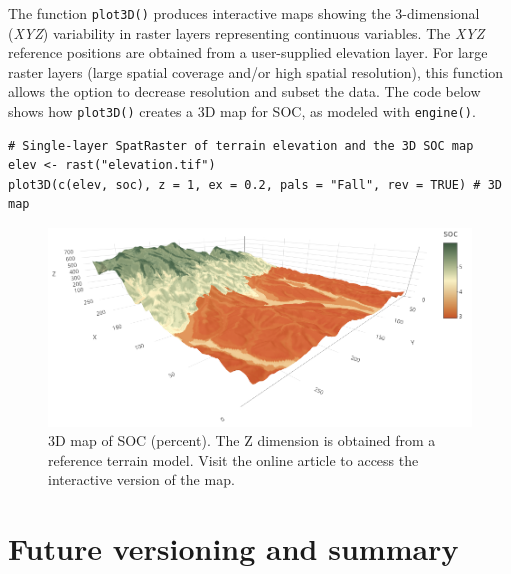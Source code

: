 The function \texttt{plot3D()} produces interactive maps showing the 3-dimensional
(\emph{XYZ}) variability in raster layers representing continuous variables. The
\emph{XYZ} reference positions are obtained from a user-supplied elevation layer. For
large raster layers (large spatial coverage and/or high spatial resolution),
this function allows the option to decrease resolution and subset the data. The
code below shows how \texttt{plot3D()} creates a
3D map for SOC, as modeled with \texttt{engine()}.

\begin{verbatim}
# Single-layer SpatRaster of terrain elevation and the 3D SOC map
elev <- rast("elevation.tif")
plot3D(c(elev, soc), z = 1, ex = 0.2, pals = "Fall", rev = TRUE) # 3D map
\end{verbatim}

\begin{figure}[H]

{\centering \includegraphics[width=0.95\linewidth,height=0.25\textheight]{figures/figure_18} 

}

\caption{3D map of SOC (percent). The Z dimension is obtained from a reference terrain model. Visit the online article to access the interactive version of the map.}\label{fig:f19}
\end{figure}

\hypertarget{future-versioning-and-summary}{%
\section{Future versioning and summary}\label{future-versioning-and-summary}}

